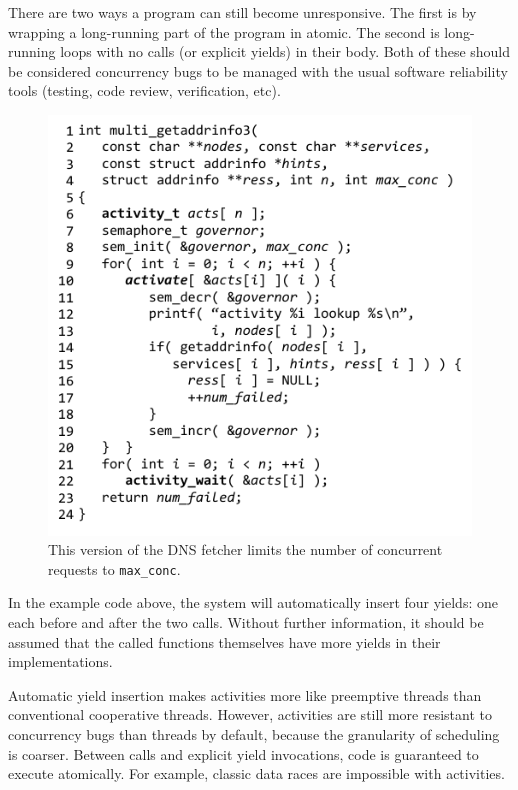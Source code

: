 \documentclass[acmsmall,anonymous,review]{acmart}\settopmatter{printfolios=true,printccs=false,printacmref=false}
\begin{document}
There are two ways a program can still become unresponsive.
The first is by wrapping a long-running part of the program in atomic.
The second is long-running loops with no calls (or explicit yields) in their body.
Both of these should be considered concurrency bugs to be managed with the usual software reliability tools (testing, code review, verification, etc).

\begin{figure}
\includegraphics{multi_getaddrinfo_sem}
\caption{This version of the DNS fetcher limits the number of concurrent requests to \texttt{max\_conc}.}
\label{fig:charcoal_multidns_sem}
\end{figure}

In the example code above, the system will automatically insert four yields: one each before and after the two calls.
Without further information, it should be assumed that the called functions themselves have more yields in their implementations.

Automatic yield insertion makes activities more like preemptive threads than conventional cooperative threads.
However, activities are still more resistant to concurrency bugs than threads by default, because the granularity of scheduling is coarser.
Between calls and explicit yield invocations, code is guaranteed to execute atomically.
For example, classic data races are impossible with activities.
\end{document}
